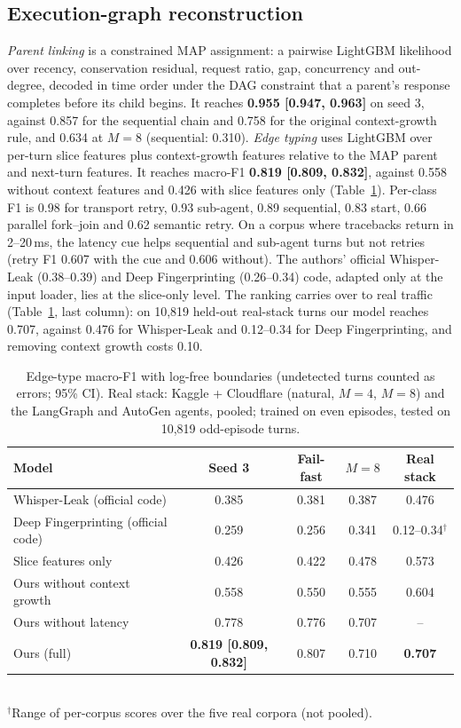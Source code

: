 \documentclass[journal]{IEEEtran}
\begin{document}
\subsection{Execution-graph reconstruction}
\emph{Parent linking} is a constrained MAP assignment: a pairwise LightGBM likelihood over recency, conservation residual, request ratio, gap, concurrency and out-degree, decoded in time order under the DAG constraint that a parent's response completes before its child begins. It reaches \textbf{0.955 [0.947, 0.963]} on seed 3, against 0.857 for the sequential chain and 0.758 for the original context-growth rule, and 0.634 at $M{=}8$ (sequential: 0.310).
\emph{Edge typing} uses LightGBM over per-turn slice features plus context-growth features relative to the MAP parent and next-turn features. It reaches macro-F1 \textbf{0.819 [0.809, 0.832]}, against 0.558 without context features and 0.426 with slice features only (Table~\ref{tab:edges}). Per-class F1 is 0.98 for transport retry, 0.93 sub-agent, 0.89 sequential, 0.83 start, 0.66 parallel fork--join and 0.62 semantic retry. On a corpus where tracebacks return in 2--20\,ms, the latency cue helps sequential and sub-agent turns but not retries (retry F1 0.607 with the cue and 0.606 without). The authors' official Whisper-Leak (0.38--0.39) and Deep Fingerprinting (0.26--0.34) code, adapted only at the input loader, lies at the slice-only level. The ranking carries over to real traffic (Table~\ref{tab:edges}, last column): on 10,819 held-out real-stack turns our model reaches 0.707, against 0.476 for Whisper-Leak and 0.12--0.34 for Deep Fingerprinting, and removing context growth costs 0.10.

\begin{table}[t]\centering
\caption{Edge-type macro-F1 with log-free boundaries (undetected turns counted as errors; 95\% CI). Real stack: Kaggle + Cloudflare (natural, $M{=}4$, $M{=}8$) and the LangGraph and AutoGen agents, pooled; trained on even episodes, tested on 10,819 odd-episode turns.}\label{tab:edges}
\small\setlength{\tabcolsep}{3pt}
\begin{tabular}{lcccc}\toprule
Model & Seed 3 & Fail-fast & $M{=}8$ & Real stack\\\midrule
Whisper-Leak (official code) & 0.385 & 0.381 & 0.387 & 0.476\\
Deep Fingerprinting (official code) & 0.259 & 0.256 & 0.341 & 0.12--0.34$^\dagger$\\
Slice features only & 0.426 & 0.422 & 0.478 & 0.573\\
Ours without context growth & 0.558 & 0.550 & 0.555 & 0.604\\
Ours without latency & 0.778 & 0.776 & 0.707 & --\\
Ours (full) & \textbf{0.819 [0.809, 0.832]} & 0.807 & 0.710 & \textbf{0.707}\\\bottomrule
\end{tabular}\\[2pt]{\footnotesize $^\dagger$Range of per-corpus scores over the five real corpora (not pooled).}
\end{table}
\end{document}
